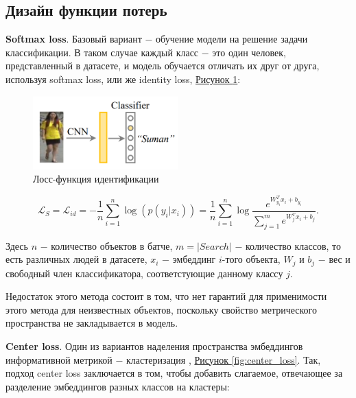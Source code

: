  \subsection{Дизайн функции потерь}

 \textbf{Softmax loss}. Базовый вариант $-$ обучение модели на решение задачи классификации. В таком случае каждый класс $-$ это один человек, представленный в датасете, и модель обучается отличать их друг от друга, используя softmax loss, или же identity loss, \hyperref[fig:identity_loss]{Рисунок \ref*{fig:identity_loss}}:

 \begin{figure}[ht]
     \centering
     \includegraphics[width=0.5\textwidth]{images/closed_world/identity_loss.png}
     \caption{Лосс-функция идентификации \cite{ye2021deep}}
     \label{fig:identity_loss}
 \end{figure}

 \begin{equation}
     \mathcal L_{S} = \mathcal L_{id} = - \frac{1}{n}\sum \limits_{i = 1}^n \log \left( p (y_i | x_i) \right) = \frac{1}{n}\sum \limits_{i = 1}^n \log \frac{e^{W_{y_i}^T x_i + b_{y_i}}}{\sum_{j=1}^m e^{W_j^T x_i + b_j}}.
 \end{equation}

 Здесь $n$ $-$ количество объектов в батче, $m = |Search|$ $-$ количество классов, то есть различных людей в датасете, $x_i$ $-$ эмбеддинг $i$-того объекта, $W_j$ и $b_j$ $-$ вес и свободный член классификатора, соответстующие данному классу $j$.

 Недостаток этого метода состоит в том, что нет гарантий для применимости этого метода для неизвестных объектов, поскольку свойство метрического пространства не закладывается в модель.

 \textbf{Center loss}. Один из вариантов наделения пространства эмбеддингов информативной метрикой $-$ кластеризация \cite{wen2016discriminative}, \hyperref[fig:center_loss]{Рисунок \ref*{fig:center_loss}}. Так, подход center loss заключается в том, чтобы добавить слагаемое, отвечающее за разделение эмбеддингов разных классов на кластеры:

